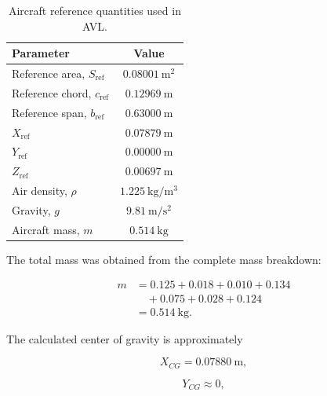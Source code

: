 \documentclass[11pt,a4paper]{article}
\begin{document}
\begin{table}[H]
\centering
\caption{Aircraft reference quantities used in AVL.}
\label{tab:reference_data}
\begin{tabular}{lc}
\toprule
Parameter & Value \\
\midrule
Reference area, $S_{\mathrm{ref}}$
    & $0.08001~\mathrm{m^2}$ \\

Reference chord, $c_{\mathrm{ref}}$
    & $0.12969~\mathrm{m}$ \\

Reference span, $b_{\mathrm{ref}}$
    & $0.63000~\mathrm{m}$ \\

$X_{\mathrm{ref}}$
    & $0.07879~\mathrm{m}$ \\

$Y_{\mathrm{ref}}$
    & $0.00000~\mathrm{m}$ \\

$Z_{\mathrm{ref}}$
    & $0.00697~\mathrm{m}$ \\

Air density, $\rho$
    & $1.225~\mathrm{kg/m^3}$ \\

Gravity, $g$
    & $9.81~\mathrm{m/s^2}$ \\

Aircraft mass, $m$
    & $0.514~\mathrm{kg}$ \\

\bottomrule
\end{tabular}
\end{table}

The total mass was obtained from the complete mass breakdown:

\begin{equation}
\begin{aligned}
m &=
0.125+0.018+0.010+0.134\\
&\quad+0.075+0.028+0.124\\
&=0.514~\mathrm{kg}.
\end{aligned}
\end{equation}

The calculated center of gravity is approximately

\begin{equation}
X_{CG}=0.07880~\mathrm{m},
\end{equation}

\begin{equation}
Y_{CG}\approx0,
\end{equation}
\end{document}
